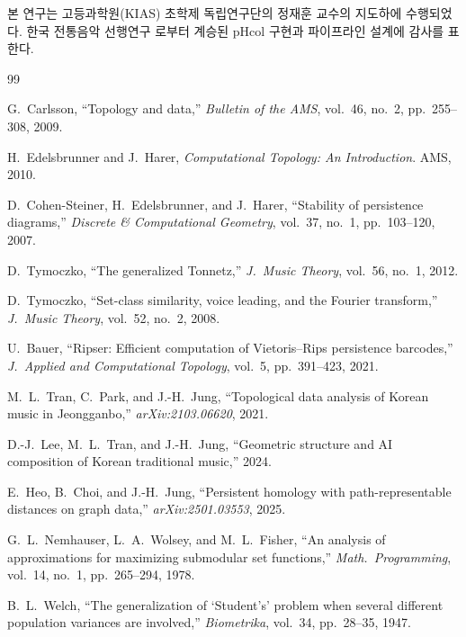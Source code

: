 \documentclass[11pt,a4paper]{article}
\begin{document}
본 연구는 고등과학원(KIAS) 초학제 독립연구단의 정재훈 교수의
지도하에 수행되었다. 한국 전통음악 선행연구 \cite{lee2024}로부터
계승된 pHcol 구현과 파이프라인 설계에 감사를 표한다.


\begin{thebibliography}{99}

G.~Carlsson, ``Topology and data,''
\emph{Bulletin of the AMS}, vol.~46, no.~2, pp.~255--308, 2009.

H.~Edelsbrunner and J.~Harer,
\emph{Computational Topology: An Introduction}. AMS, 2010.

D.~Cohen-Steiner, H.~Edelsbrunner, and J.~Harer,
``Stability of persistence diagrams,''
\emph{Discrete \& Computational Geometry}, vol.~37, no.~1,
pp.~103--120, 2007.

D.~Tymoczko, ``The generalized Tonnetz,''
\emph{J.\ Music Theory}, vol.~56, no.~1, 2012.

D.~Tymoczko, ``Set-class similarity, voice leading, and the Fourier
transform,'' \emph{J.\ Music Theory}, vol.~52, no.~2, 2008.

U.~Bauer, ``Ripser: Efficient computation of Vietoris--Rips persistence
barcodes,'' \emph{J.\ Applied and Computational Topology}, vol.~5,
pp.~391--423, 2021.

M.~L.~Tran, C.~Park, and J.-H.~Jung, ``Topological data analysis of
Korean music in Jeongganbo,'' \emph{arXiv:2103.06620}, 2021.

D.-J.~Lee, M.~L.~Tran, and J.-H.~Jung, ``Geometric structure and AI
composition of Korean traditional music,'' 2024.

E.~Heo, B.~Choi, and J.-H.~Jung, ``Persistent homology with
path-representable distances on graph data,''
\emph{arXiv:2501.03553}, 2025.

G.~L.~Nemhauser, L.~A.~Wolsey, and M.~L.~Fisher, ``An analysis of
approximations for maximizing submodular set functions,''
\emph{Math.\ Programming}, vol.~14, no.~1, pp.~265--294, 1978.

B.~L.~Welch, ``The generalization of `Student's' problem when several
different population variances are involved,''
\emph{Biometrika}, vol.~34, pp.~28--35, 1947.


\end{thebibliography}
\end{document}
